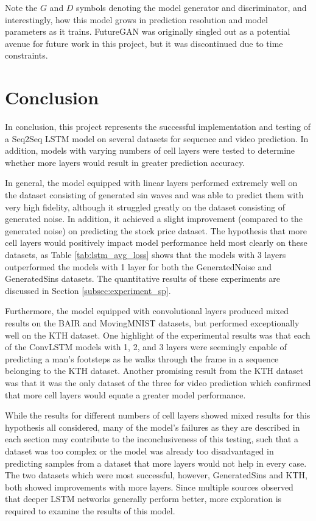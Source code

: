 \documentclass{scrartcl}
\begin{document}
Note the $G$ and $D$ symbols denoting the model generator and discriminator,
and interestingly, how this model grows in prediction resolution and model
parameters as it trains. FutureGAN was originally singled out as a potential
avenue for future work in this project, but it was discontinued due to time
constraints.

\newpage
\section{Conclusion}
\label{sec:conclusion}

In conclusion, this project represents the successful implementation and
testing of a Seq2Seq LSTM model on several datasets for sequence and video
prediction. In addition, models with varying numbers of cell layers were tested
to determine whether more layers would result in greater prediction accuracy.

In general, the model equipped with linear layers performed extremely well on
the dataset consisting of generated sin waves and was able to predict them with
very high fidelity, although it struggled greatly on the dataset consisting of
generated noise. In addition, it achieved a slight improvement (compared to the
generated noise) on predicting the stock price dataset. The hypothesis that
more cell layers would positively impact model performance held most clearly on
these datasets, as Table \ref{tab:lstm_avg_loss} shows that the models with 3
layers outperformed the models with 1 layer for both the GeneratedNoise and
GeneratedSins datasets. The quantitative results of these experiments are
discussed in Section \ref{subsec:experiment_sp}.

Furthermore, the model equipped with convolutional layers produced mixed
results on the BAIR and MovingMNIST datasets, but performed exceptionally well
on the KTH dataset. One highlight of the experimental results was that each of
the ConvLSTM models with 1, 2, and 3 layers were seemingly capable of
predicting a man's footsteps as he walks through the frame in a sequence
belonging to the KTH dataset. Another promising result from the KTH dataset was
that it was the only dataset of the three for video prediction which confirmed
that more cell layers would equate a greater model performance.

While the results for different numbers of cell layers showed mixed results for
this hypothesis all considered, many of the model's failures as they are
described in each section may contribute to the inconclusiveness of this
testing, such that a dataset was too complex or the model was already too
disadvantaged in predicting samples from a dataset that more layers would not
help in every case. The two datasets which were most successful, however,
GeneratedSins and KTH, both showed improvements with more layers. Since
multiple sources \cite{mmnist_dataset, seq2seq_original} observed that deeper
LSTM networks generally perform better, more exploration is required to examine
the results of this model.
\end{document}
